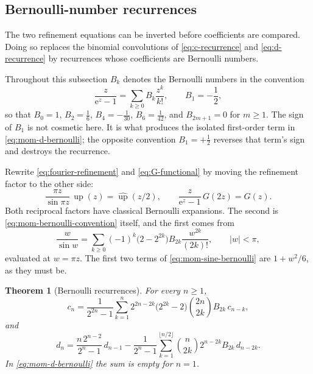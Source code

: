 \documentclass[11pt,oneside]{article}
\newtheorem{theorem}{Theorem}[section]
\theoremstyle{definition}
\theoremstyle{remark}
\newcommand{\Up}{\operatorname{up}}
\newcommand{\e}{\mathrm e}
\begin{document}
\subsection{Bernoulli-number recurrences}

The two refinement equations can be inverted before coefficients are compared.  Doing so
replaces the binomial convolutions of \eqref{eq:c-recurrence} and \eqref{eq:d-recurrence} by
recurrences whose coefficients are Bernoulli numbers.

Throughout this subsection $B_k$ denotes the Bernoulli numbers in the convention
\begin{equation}
 \frac{z}{\e^z-1}=\sum_{k\ge0}B_k\frac{z^k}{k!},
 \qquad B_1=-\frac12,                                      \label{eq:mom-bernoulli-convention}
\end{equation}
so that $B_0=1$, $B_2=\tfrac16$, $B_4=-\tfrac1{30}$, $B_6=\tfrac1{42}$, and $B_{2m+1}=0$ for
$m\ge1$.  The sign of $B_1$ is not cosmetic here.  It is what produces the isolated
first-order term in \eqref{eq:mom-d-bernoulli}; the opposite convention $B_1=+\tfrac12$
reverses that term's sign and destroys the recurrence.

Rewrite \eqref{eq:fourier-refinement} and \eqref{eq:G-functional} by moving the refinement
factor to the other side:
\begin{equation}
 \frac{\pi z}{\sin\pi z}\,\widehat{\Up}(z)=\widehat{\Up}(z/2),
 \qquad
 \frac{z}{\e^z-1}\,G(2z)=G(z).                             \label{eq:mom-reciprocal-refinements}
\end{equation}
Both reciprocal factors have classical Bernoulli expansions.  The second is
\eqref{eq:mom-bernoulli-convention} itself, and the first comes from
\begin{equation}
 \frac{w}{\sin w}
 =\sum_{k\ge0}(-1)^k\bigl(2-2^{2k}\bigr)B_{2k}\frac{w^{2k}}{(2k)!},
 \qquad|w|<\pi,                                            \label{eq:mom-sine-bernoulli}
\end{equation}
evaluated at $w=\pi z$.  The first two terms of \eqref{eq:mom-sine-bernoulli} are
$1+w^2/6$, as they must be.

\begin{theorem}[Bernoulli recurrences]                     \label{thm:mom-bernoulli-recurrences}
For every $n\ge1$,
\begin{equation}
 c_n=\frac{1}{2^{2n}-1}\sum_{k=1}^{n}
 2^{2n-2k}\bigl(2^{2k}-2\bigr)\binom{2n}{2k}B_{2k}\,c_{n-k},
                                                           \label{eq:mom-c-bernoulli}
\end{equation}
and
\begin{equation}
 d_n=\frac{n\,2^{n-2}}{2^n-1}\,d_{n-1}
 -\frac{1}{2^n-1}\sum_{k=1}^{\lfloor n/2\rfloor}
 \binom{n}{2k}2^{n-2k}B_{2k}\,d_{n-2k}.                    \label{eq:mom-d-bernoulli}
\end{equation}
In \eqref{eq:mom-d-bernoulli} the sum is empty for $n=1$.
\end{theorem}
\end{document}
